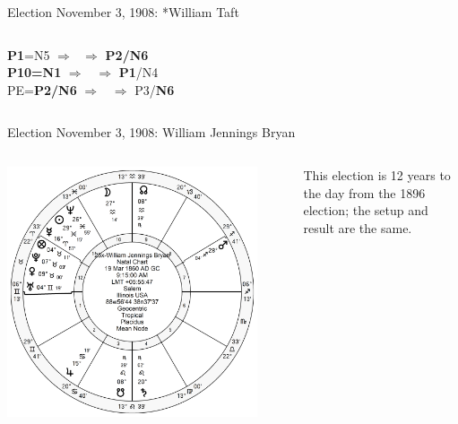 \begin{frame}[t]{Election November 3, 1908: *William Taft}
\begin{columns}[T, onlytextwidth]
\textbf{\dgreen P1}=N5
	$\Rightarrow$ \Sun\,\Conjunction\,\SouthNode $\Rightarrow$ \textbf{\dgreen P2/N6} \\
\textbf{\red P10=N1} 
	$\Rightarrow$  \Venus\, $\Rightarrow$  \textbf{\dgreen P1}/N4 \\
PE=\textbf{\dgreen P2/N6}
	$\Rightarrow$  \Mercury\, $\Rightarrow$  P3/\textbf{\dgreen N6}

\end{columns}
\end{frame}

\begin{frame}[t]{Election November 3, 1908: William Jennings Bryan}
\small
\begin{columns}[T, onlytextwidth]
\vspace{-1em}
{\includegraphics[width=0.9\textwidth]{charts/Bryan.png}}
\fontsize{8pt}{9pt}\selectfont

This election is 12 years to the day from the 1896 election; the setup and result are the same.


\end{columns}
\end{frame}
